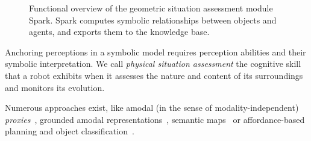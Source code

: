 \documentclass[preprint,3p,times]{elsarticle}
\begin{document}
\begin{figure}
\centering
{}
    \caption{Functional overview of the geometric situation assessment module
    {\sc Spark}. {\sc Spark} computes symbolic relationships between objects
    and agents, and exports them to the knowledge base.  }

        \label{fig|spark-oro}
\end{figure}

Anchoring perceptions in a symbolic model requires perception abilities and
their symbolic interpretation. We call \emph{physical situation assessment} the
cognitive skill that a robot exhibits when it assesses the nature and content of its
surroundings and monitors its evolution.

Numerous approaches exist, like amodal (in the sense of modality-independent)
\emph{proxies}~\cite{Jacobsson2008}, grounded amodal
representations~\cite{Mavridis2006}, semantic
maps~\cite{Nuechter2008, Galindo2008,Blodow2011} or affordance-based planning
and object classification~\cite{Lorken2008, Varadarajan2011}.

\end{document}
